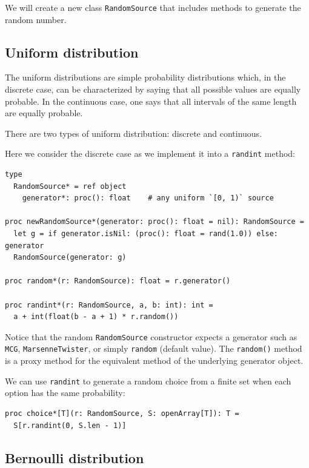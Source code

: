 \documentclass[justified, sixbynine]{tufte-book}
\def\ft{\small\tt}
\theoremstyle{plain}%
\newtheorem * {corollary}{Corollary}
\theoremstyle{definition}
\theoremstyle{remark}
\newtheorem * {remark}{Remark}
\newtheorem * {note}{Note}
\begin{document}
\begin{fullwidth}
We will create a new class {\ft RandomSource} that includes methods to generate the random number.

\goodbreak\subsection{Uniform distribution}

The uniform distributions are simple probability distributions which, in the
discrete case, can be characterized by saying that all possible values are
equally probable. In the continuous case, one says that all intervals of the
same length are equally probable.

There are two types of uniform distribution: discrete and continuous.

Here we consider the discrete case as we implement it into a {\ft randint} method:


\begin{lstlisting}[caption={in file: {\ft nlib.nim}}]
type
  RandomSource* = ref object
    generator*: proc(): float    # any uniform `[0, 1)` source

proc newRandomSource*(generator: proc(): float = nil): RandomSource =
  let g = if generator.isNil: (proc(): float = rand(1.0)) else: generator
  RandomSource(generator: g)

proc random*(r: RandomSource): float = r.generator()

proc randint*(r: RandomSource, a, b: int): int =
  a + int(float(b - a + 1) * r.random())
\end{lstlisting}

Notice that the random {\ft RandomSource} constructor expects a generator such as {\ft MCG}, {\ft MarsenneTwister}, or simply {\ft random} (default value). The {\ft random()} method is a proxy method for the equivalent method of the underlying generator object.

We can use {\ft randint} to generate a random choice from a finite set when each option has the same probability:

\begin{lstlisting}[caption={in file: {\ft nlib.nim}}]
proc choice*[T](r: RandomSource, S: openArray[T]): T =
  S[r.randint(0, S.len - 1)]
\end{lstlisting}

\goodbreak\subsection{Bernoulli distribution}


\end{fullwidth}
\end{document}
